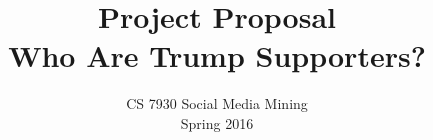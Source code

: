 \documentclass{sig-alternate-05-2015}
\begin{document}



%

\title{Project Proposal\\Who Are Trump Supporters?}
\subtitle{CS 7930 Social Media Mining\\
Spring 2016}
%
%
%
%
%
\end{document}
